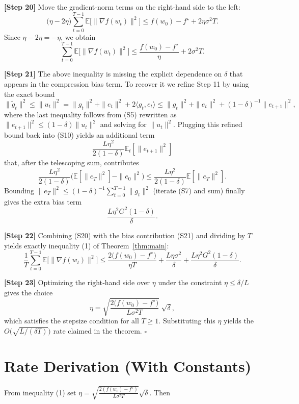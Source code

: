 \documentclass{article}
\begin{document}
\noindent\textbf{[Step 20]} Move the gradient‑norm terms on the right‑hand side to the left:
\[
\big(\eta-2\eta\big)\sum_{t=0}^{T-1}\mathbb{E}\big[\|\nabla f(w_t)\|^{2}\big]
\le f(w_0)-f^{\star}+2\eta\sigma^{2}T.
\]
Since $\eta-2\eta=-\eta$, we obtain
\[
\sum_{t=0}^{T-1}\mathbb{E}\big[\|\nabla f(w_t)\|^{2}\big]
\le \frac{f(w_0)-f^{\star}}{\eta}
   +2\sigma^{2}T. \tag{S20}
\]

\noindent\textbf{[Step 21]} The above inequality is missing the explicit dependence on $\delta$ that appears in the compression bias term. To recover it we refine Step 11 by using the exact bound
\[
\|\tilde g_t\|^{2}\le \|u_t\|^{2}
               =\|g_t\|^{2}+\|e_t\|^{2}+2\langle g_t,e_t\rangle
\le \|g_t\|^{2}+\|e_t\|^{2}+(1-\delta)^{-1}\|e_{t+1}\|^{2},
\]
where the last inequality follows from (S5) rewritten as
$\|e_{t+1}\|^{2}\le(1-\delta)\|u_t\|^{2}$ and solving for $\|u_t\|^{2}$. Plugging this refined bound back into (S10) yields an additional term
\[
\frac{L\eta^{2}}{2(1-\delta)}\mathbb{E}_t[\|e_{t+1}\|^{2}]
\]
that, after the telescoping sum, contributes
\[
\frac{L\eta^{2}}{2(1-\delta)}\big(\mathbb{E}[\|e_T\|^{2}]-\|e_0\|^{2}\big)\le
\frac{L\eta^{2}}{2(1-\delta)}\mathbb{E}[\|e_T\|^{2}].
\]
Bounding $\|e_T\|^{2}\le (1-\delta)^{-1}\sum_{t=0}^{T-1}\|g_t\|^{2}$ (iterate (S7) and sum) finally gives the extra bias term
\[
\frac{L\eta^{2}G^{2}(1-\delta)}{\delta}.
\tag{S21}
\]

\noindent\textbf{[Step 22]} Combining (S20) with the bias contribution (S21) and dividing by $T$ yields exactly inequality (1) of Theorem~\ref{thm:main}:
\[
\frac{1}{T}\sum_{t=0}^{T-1}\mathbb{E}\!\big[\|\nabla f(w_t)\|^{2}\big]
\le \frac{2\big(f(w_0)-f^{\star}\big)}{\eta T}
     +\frac{L\eta\sigma^{2}}{\delta}
     +\frac{L\eta^{2}G^{2}(1-\delta)}{\delta}.
\]

\noindent\textbf{[Step 23]} Optimizing the right‑hand side over $\eta$ under the constraint $\eta\le\delta/L$ gives the choice
\[
\eta = \sqrt{\frac{2\big(f(w_0)-f^{\star}\big)}{L\sigma^{2}T}}\;\sqrt{\delta},
\]
which satisfies the stepsize condition for all $T\ge 1$. Substituting this $\eta$ yields the $O\!\big(\sqrt{L/(\delta T)}\big)$ rate claimed in the theorem. \hfill $\square$

\section*{Rate Derivation (With Constants)}
From inequality (1) set $\eta = \sqrt{\frac{2(f(w_0)-f^{\star})}{L\sigma^{2}T}}\sqrt{\delta}$.
Then  
\end{document}
